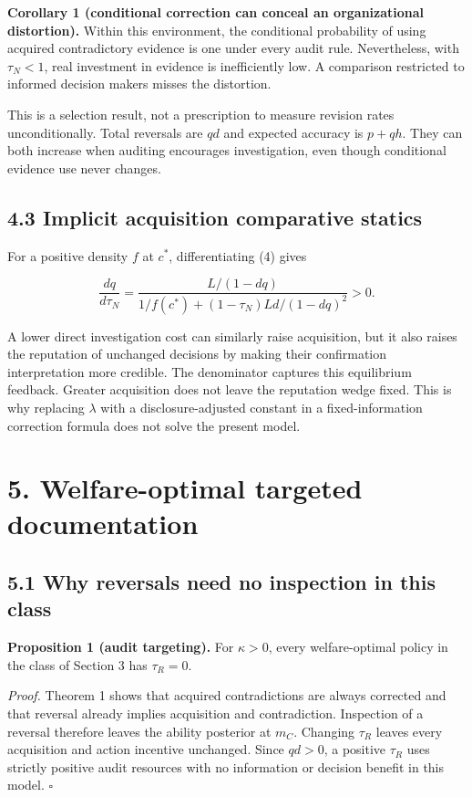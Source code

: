 \documentclass[
  11pt,
]{article}
\begin{document}
\textbf{Corollary 1 (conditional correction can conceal an
organizational distortion).} Within this environment, the conditional
probability of using acquired contradictory evidence is one under every
audit rule. Nevertheless, with \(\tau_N<1\), real investment in evidence
is inefficiently low. A comparison restricted to informed decision
makers misses the distortion.

This is a selection result, not a prescription to measure revision rates
unconditionally. Total reversals are \(qd\) and expected accuracy is
\(p+qh\). They can both increase when auditing encourages investigation,
even though conditional evidence use never changes.

\subsection{4.3 Implicit acquisition comparative
statics}\label{implicit-acquisition-comparative-statics}

For a positive density \(f\) at \(c^*\), differentiating (4) gives

\[\frac{dq}{d\tau_N}=\frac{L/(1-dq)}{1/f(c^*)+(1-\tau_N)Ld/(1-dq)^2}>0.\tag{7}\]

A lower direct investigation cost can similarly raise acquisition, but
it also raises the reputation of unchanged decisions by making their
confirmation interpretation more credible. The denominator captures this
equilibrium feedback. Greater acquisition does not leave the reputation
wedge fixed. This is why replacing \(\lambda\) with a
disclosure-adjusted constant in a fixed-information correction formula
does not solve the present model.

\section{5. Welfare-optimal targeted
documentation}\label{welfare-optimal-targeted-documentation}

\subsection{5.1 Why reversals need no inspection in this
class}\label{why-reversals-need-no-inspection-in-this-class}

\textbf{Proposition 1 (audit targeting).} For \(\kappa>0\), every
welfare-optimal policy in the class of Section 3 has \(\tau_R=0\).

\emph{Proof.} Theorem 1 shows that acquired contradictions are always
corrected and that reversal already implies acquisition and
contradiction. Inspection of a reversal therefore leaves the ability
posterior at \(m_C\). Changing \(\tau_R\) leaves every acquisition and
action incentive unchanged. Since \(qd>0\), a positive \(\tau_R\) uses
strictly positive audit resources with no information or decision
benefit in this model. \(\square\)
\end{document}
